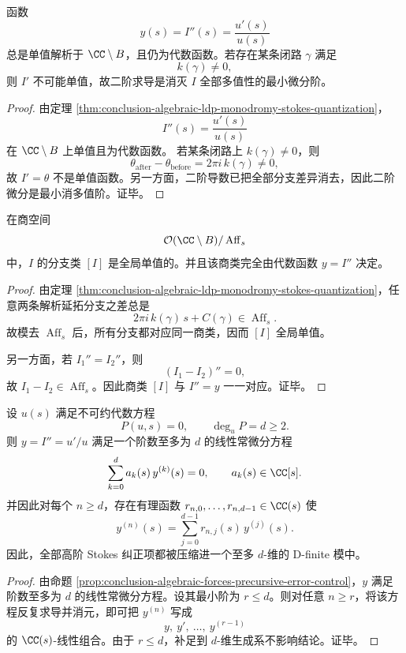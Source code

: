 \begin{theorem}[二阶微分是消灭全部多值性的最小阶]\label{thm:conclusion-algebraic-ldp-second-derivative-minimal-singlevaluedness}
函数
\[
y(s)=I''(s)=\frac{u'(s)}{u(s)}
\]
总是单值解析于 \(\CC\setminus B\)，且仍为代数函数。若存在某条闭路 \(\gamma\) 满足
\[
k(\gamma)\neq 0,
\]
则 \(I'\) 不可能单值，故二阶求导是消灭 \(I\) 全部多值性的最小微分阶。
\end{theorem}
\begin{proof}
由定理 \ref{thm:conclusion-algebraic-ldp-monodromy-stokes-quantization}，
\[
I''(s)=\frac{u'(s)}{u(s)}
\]
在 \(\CC\setminus B\) 上单值且为代数函数。
若某条闭路上 \(k(\gamma)\neq 0\)，则
\[
\theta_{\mathrm{after}}-\theta_{\mathrm{before}}=2\pi i\,k(\gamma)\neq 0,
\]
故 \(I'=\theta\) 不是单值函数。另一方面，二阶导数已把全部分支差异消去，因此二阶微分是最小消多值阶。证毕。
\end{proof}

\begin{theorem}\label{thm:conclusion-algebraic-ldp-affine-quotient-singlevaluedness}
在商空间
\[
\mathcal O(\CC\setminus B)/\operatorname{Aff}_s
\]
中，\(I\) 的分支类 \([I]\) 是全局单值的。并且该商类完全由代数函数 \(y=I''\) 决定。
\end{theorem}
\begin{proof}
由定理 \ref{thm:conclusion-algebraic-ldp-monodromy-stokes-quantization}，任意两条解析延拓分支之差总是
\[
2\pi i\,k(\gamma)\,s+C(\gamma)\in \operatorname{Aff}_s.
\]
故模去 \(\operatorname{Aff}_s\) 后，所有分支都对应同一商类，因而 \([I]\) 全局单值。

另一方面，若 \(I_1''=I_2''\)，则
\[
(I_1-I_2)''=0,
\]
故 \(I_1-I_2\in \operatorname{Aff}_s\)。因此商类 \([I]\) 与 \(I''=y\) 一一对应。证毕。
\end{proof}

\begin{theorem}\label{thm:conclusion-algebraic-ldp-dfinite-stokes-compression}
设 \(u(s)\) 满足不可约代数方程
\[
P(u,s)=0,
\qquad
\deg_u P=d\ge 2.
\]
则 \(y=I''=u'/u\) 满足一个阶数至多为 \(d\) 的线性常微分方程
\[
\sum_{k=0}^{d}a_k(s)\,y^{(k)}(s)=0,
\qquad
a_k(s)\in \CC[s].
\]
并因此对每个 \(n\ge d\)，存在有理函数 \(r_{n,0},\dots,r_{n,d-1}\in \CC(s)\) 使
\[
y^{(n)}(s)=\sum_{j=0}^{d-1}r_{n,j}(s)\,y^{(j)}(s).
\]
因此，全部高阶 Stokes 纠正项都被压缩进一个至多 \(d\)-维的 D-finite 模中。
\end{theorem}
\begin{proof}
由命题 \ref{prop:conclusion-algebraic-forces-precursive-error-control}，\(y\) 满足阶数至多为 \(d\) 的线性常微分方程。设其最小阶为 \(r\le d\)。则对任意 \(n\ge r\)，将该方程反复求导并消元，即可把 \(y^{(n)}\) 写成
\[
y,\ y',\ \dots,\ y^{(r-1)}
\]
的 \(\CC(s)\)-线性组合。由于 \(r\le d\)，补足到 \(d\)-维生成系不影响结论。证毕。
\end{proof}

